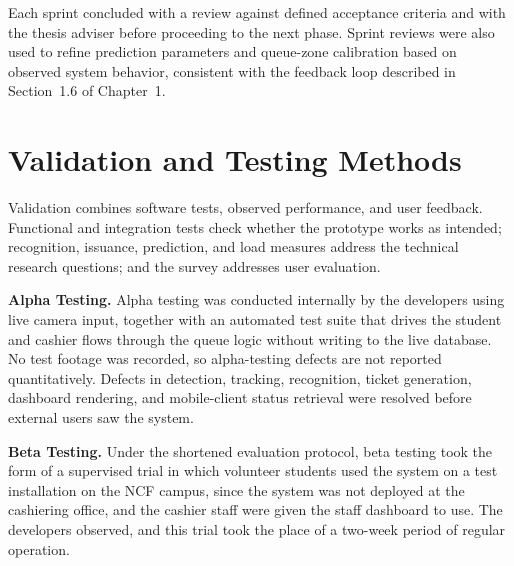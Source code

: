 \documentclass{research}
\newcommand{\sysname}{QueuEx}
\begin{document}
%

Each sprint concluded with a review against defined acceptance
criteria and with the thesis adviser before proceeding to the next
phase. Sprint reviews were also used to refine prediction parameters
and queue-zone calibration based on observed system behavior,
consistent with the feedback loop described in Section~1.6 of
Chapter~1.

\section{Validation and Testing Methods}
\label{cr:validation}

Validation combines software tests, observed performance, and user
feedback. Functional and integration tests check whether the prototype
works as intended; recognition, issuance, prediction, and load measures
address the technical research questions; and the survey addresses user
evaluation.

\textbf{Alpha Testing.} Alpha testing was conducted internally by the
developers using live camera input, together with an automated test
suite that drives the student and cashier flows through the queue logic
without writing to the live database. No test footage was recorded, so
alpha-testing defects are not reported quantitatively. Defects in
detection, tracking, recognition, ticket generation, dashboard
rendering, and mobile-client status retrieval were resolved before
external users saw the system.

\textbf{Beta Testing.} Under the shortened evaluation protocol, beta
testing took the form of a supervised trial in which volunteer students
used the system on a test installation on the NCF campus, since the
system was not deployed at the cashiering office, and the cashier staff
were given the staff dashboard to use. The developers observed, and
this trial took the place of a two-week period of regular operation.
\end{document}
